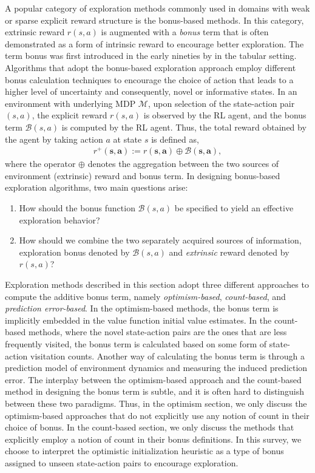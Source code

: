 \label{Bonus}
A popular category of exploration methods commonly used in domains with weak or sparse explicit reward structure is the bonus-based methods. In this category, extrinsic reward $r(s, a)$ is augmented with a \textit{bonus} term that is often demonstrated as a form of intrinsic reward  to encourage better exploration. The term bonus was first introduced in the early nineties by  in the tabular setting. Algorithms that adopt the bonus-based exploration approach employ different bonus calculation techniques to encourage the choice of action that leads to a higher level of uncertainty and consequently, novel or informative states. 
In an environment with underlying MDP $\mathcal{M}$, upon selection of the state-action pair $(s, a)$, the explicit reward  $r(s, a)$ is observed by the RL agent, and the bonus term $\mathcal{B}(s, a)$ is computed by the RL agent. Thus, the total reward obtained by the agent by taking action $a$ at state $s$ is defined as, 
\begin{align}
    r^+(\textbf{s},\textbf{a}) := r(\textbf{s},\textbf{a}) \oplus \mathcal{B}(\textbf{s},\textbf{a}),
\end{align}
where the operator $\oplus$ denotes the aggregation between the two sources of environment (extrinsic) reward and bonus term.
In designing bonus-based exploration algorithms, two main questions arise: 
\begin{enumerate}
    \item How should the bonus function $\mathcal{B}(s,a)$ be specified to yield an effective exploration behavior?
    \item How should we combine the two separately acquired sources of information, exploration bonus denoted by $\mathcal{B}(s,a)$ and \textit{extrinsic} reward denoted by $r(s,a)$?
\end{enumerate}
Exploration methods described in this section adopt three different approaches to compute the additive bonus term, namely \textit{optimism-based}, \textit{count-based}, and \textit{prediction error-based}. In the optimism-based methods, the bonus term is implicitly embedded in the value function initial value estimates. In the count-based methods, where the novel state-action pairs are the ones that are less frequently visited, the bonus term is calculated based on some form of state-action visitation counts. Another way of calculating the bonus term is through a prediction model of environment dynamics and measuring the induced prediction error. The interplay between the optimism-based approach and the count-based method in designing the bonus term is subtle, and it is often hard to distinguish between these two paradigms. Thus, in the optimism section, we only discuss the optimism-based approaches that do not explicitly use any notion of count in their choice of bonus. In the count-based section, we only discuss the methods that explicitly employ a notion of count in their bonus definitions. In this survey, we choose to interpret the optimistic initialization heuristic as a type of bonus assigned to unseen state-action pairs to encourage exploration. 
